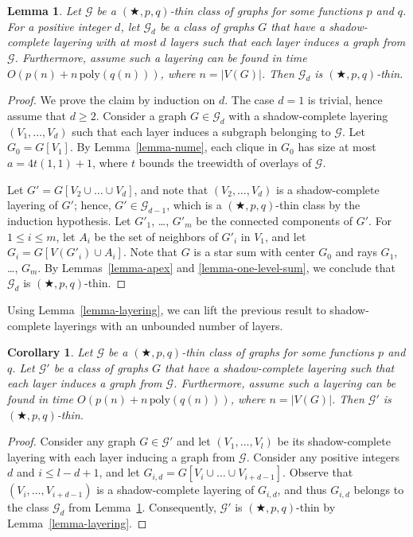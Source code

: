 \documentclass[a4paper,11pt]{article}
\newcommand{\GG}{{\mathcal G}}
\newcommand{\poly}{\text{poly}}
\newtheorem{corollary}[theorem]{Corollary}
\newtheorem{lemma}[theorem]{Lemma}
\begin{document}
\begin{lemma}\label{lemma-shadow}
Let $\GG$ be a $(\bigstar,p,q)$-thin class of graphs for some functions $p$ and $q$.
For a positive integer $d$, let $\GG_d$ be a class of graphs $G$ that have a shadow-complete layering with at most $d$
layers such that each layer induces a graph from $\GG$.  Furthermore, assume such a layering can be found in time $O(p(n)+n\,\poly(q(n)))$,
where $n=|V(G)|$.
Then $\GG_d$ is $(\bigstar,p,q)$-thin.
\end{lemma}
\begin{proof}
We prove the claim by induction on $d$.  The case $d=1$ is trivial, hence assume that $d\ge 2$.
Consider a graph $G\in\GG_d$ with a shadow-complete layering $(V_1,\ldots, V_d)$ such that each layer induces a subgraph belonging to $\GG$.
Let $G_0=G[V_1]$.  By Lemma~\ref{lemma-nume}, each clique in $G_0$ has size at most $a=4t(1,1)+1$,
where $t$ bounds the treewidth of overlays of $\GG$.

Let $G'=G[V_2\cup\ldots\cup V_d]$, and note that $(V_2,\ldots,V_d)$ is a shadow-complete layering of $G'$; hence,
$G'\in \GG_{d-1}$, which is a $(\bigstar,p,q)$-thin class by the induction hypothesis.  Let $G'_1$, \ldots, $G'_m$ be the
connected components of $G'$.  For $1\le i\le m$, let $A_i$ be the set of neighbors of $G'_i$ in $V_1$,
and let $G_i=G[V(G'_i)\cup A_i]$.  Note that $G$ is a star sum with center $G_0$ and rays $G_1$, \ldots, $G_m$.
By Lemmas~\ref{lemma-apex} and \ref{lemma-one-level-sum}, we conclude that $\GG_d$ is $(\bigstar,p,q)$-thin.
\end{proof}

Using Lemma~\ref{lemma-layering}, we can lift the previous result to shadow-complete layerings with an unbounded number of layers.

\begin{corollary}\label{cor-shadowmany}
Let $\GG$ be a $(\bigstar,p,q)$-thin class of graphs for some functions $p$ and $q$.
Let $\GG'$ be a class of graphs $G$ that have a shadow-complete layering such that each layer induces a graph from $\GG$.
Furthermore, assume such a layering can be found in time $O(p(n)+n\,\poly(q(n)))$, where $n=|V(G)|$.
Then $\GG'$ is $(\bigstar,p,q)$-thin.
\end{corollary}
\begin{proof}
Consider any graph $G\in \GG'$ and let $(V_1,\ldots, V_l)$ be its shadow-complete layering with each layer inducing a graph
from $\GG$.  Consider any positive integers $d$ and $i\le l-d+1$, and let $G_{i,d}=G[V_i\cup\ldots\cup V_{i+d-1}]$.
Observe that $(V_i,\ldots,V_{i+d-1})$ is a shadow-complete layering of $G_{i,d}$, and thus $G_{i,d}$ belongs
to the class $\GG_d$ from Lemma~\ref{lemma-shadow}.  Consequently, $\GG'$ is $(\bigstar,p,q)$-thin by Lemma~\ref{lemma-layering}.
\end{proof}
\end{document}
